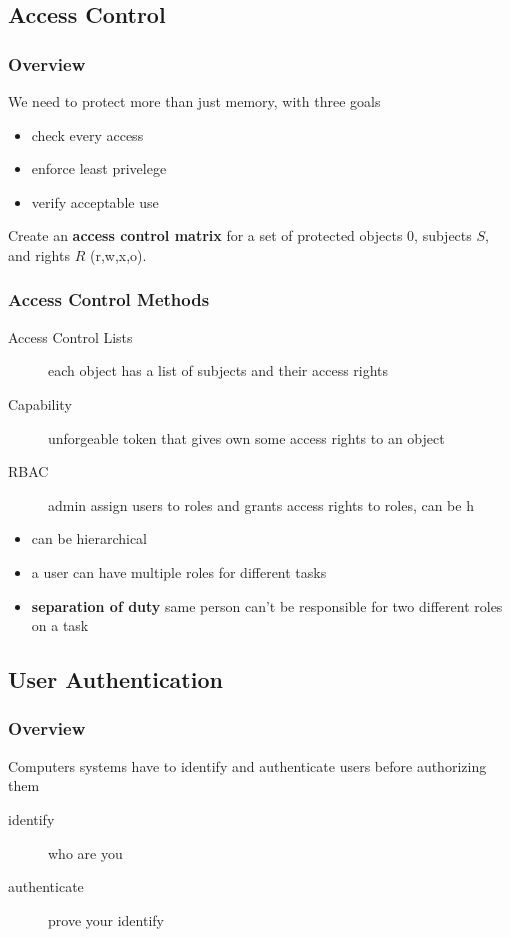 \documentclass[]{article}
\theoremstyle{definition}
\begin{document}
	\subsection{Access Control}
	\subsubsection{Overview}
	We need to protect more than just memory, with three goals
	\begin{itemize}
		\item check every access
		\item enforce least privelege
		\item verify acceptable use
	\end{itemize}

	Create an \textbf{access control matrix} for a set of protected objects $0$, subjects $S$, and rights $R$ (r,w,x,o).

	\subsubsection{Access Control Methods}
	\begin{description}
		\item[Access Control Lists] each object has a list of subjects and their access rights
		\item[Capability] unforgeable token that gives own some access rights to an object
		\item[RBAC] admin assign users to roles and grants access rights to roles, can be h
	\end{description}
	\begin{itemize}
		\item can be hierarchical
		\item a user can have multiple roles for different tasks
		\item \textbf{separation of duty} same person can't be responsible for two different roles on a task
	\end{itemize}
	
	\subsection{User Authentication}
	\subsubsection{Overview}
	Computers systems have to identify and authenticate users before authorizing them
	\begin{description}
		\item[identify] who are you
		\item[authenticate] prove your identify
	\end{description}
\end{document}
